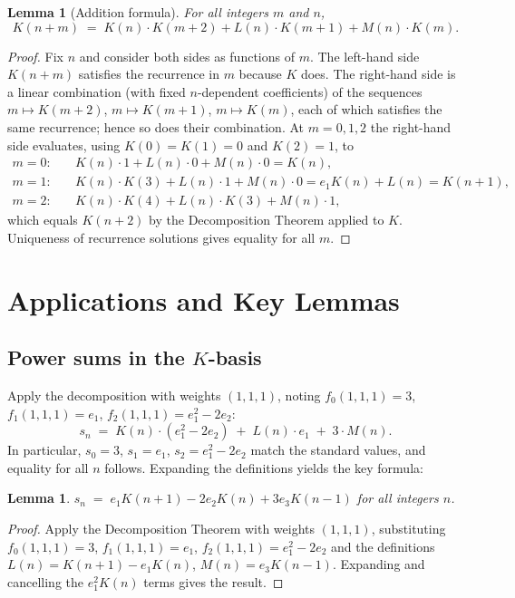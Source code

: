 \documentclass[12pt]{article}
\newtheorem{lemma}[theorem]{Lemma}
\theoremstyle{definition}
\begin{document}
	\begin{lemma}[Addition formula]
		\label{lem:addition}
		For all integers $m$ and $n$,
		\[
		K(n+m) \;=\; K(n) \cdot K(m+2) + L(n) \cdot K(m+1) + M(n) \cdot K(m).
		\]
	\end{lemma}
	\begin{proof}
		Fix $n$ and consider both sides as functions of $m$.  The left-hand side $K(n+m)$ satisfies the recurrence in $m$ because $K$ does.  The right-hand side is a linear combination (with fixed $n$-dependent coefficients) of the sequences $m \mapsto K(m+2)$, $m \mapsto K(m+1)$, $m \mapsto K(m)$, each of which satisfies the same recurrence; hence so does their combination.  At
		$m = 0, 1, 2$ the right-hand side evaluates, using $K(0)=K(1)=0$ and
		$K(2)=1$, to
		\begin{align*}
			m=0: &\quad K(n)\cdot 1 + L(n)\cdot 0 + M(n)\cdot 0 = K(n),\\
			m=1: &\quad K(n)\cdot K(3) + L(n)\cdot 1 + M(n)\cdot 0 = e_1 K(n) + L(n) = K(n+1),\\
			m=2: &\quad K(n)\cdot K(4) + L(n)\cdot K(3) + M(n)\cdot 1,
		\end{align*}
		which equals $K(n+2)$ by the Decomposition Theorem applied to $K$.
		Uniqueness of recurrence solutions gives equality for all $m$.
	\end{proof}
	
	\section{Applications and Key Lemmas}
	\label{sec:applications}
	
	\subsection{Power sums in the $K$-basis}
	
	Apply the decomposition with weights $(1,1,1)$, noting
	$f_0(1,1,1)=3$, $f_1(1,1,1)=e_1$, $f_2(1,1,1)=e_1^2-2e_2$:
	\[
	s_n \;=\; K(n) \cdot (e_1^2-2e_2) \;+\; L(n) \cdot e_1 \;+\; 3 \cdot M(n).
	\]
	In particular, $s_0=3$, $s_1=e_1$, $s_2=e_1^2-2e_2$ match the standard values, and equality for all $n$ follows.  Expanding the
	definitions yields the key formula:
	
	\begin{lemma}
		\label{lem:sn-formula}
		$s_n \;=\; e_1 K(n+1) - 2e_2 K(n) + 3e_3 K(n-1)$ for all integers $n$.
	\end{lemma}
	\begin{proof}
		Apply the Decomposition Theorem with weights $(1,1,1)$, substituting
		$f_0(1,1,1)=3$, $f_1(1,1,1)=e_1$, $f_2(1,1,1)=e_1^2-2e_2$ and the
		definitions $L(n) = K(n+1)-e_1 K(n)$, $M(n) = e_3 K(n-1)$.
		Expanding and cancelling the $e_1^2 K(n)$ terms gives the result.
	\end{proof}
	
\end{document}
